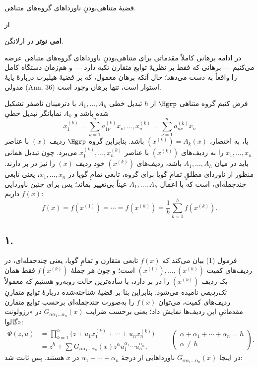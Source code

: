 \documentclass[11pt]{article}
\providecommand{\srcspaced}[1]{{\bfseries #1}}
\begin{document}
\begin{center}
{\Large قضیهٔ متناهی‌بودنِ ناورداهای گروه‌های متناهی.}\par
\vspace{1.2em}
از\par
\vspace{0.8em}
\srcspaced{امی نوتر} در ارلانگن.
\end{center}

در ادامه برهانی کاملاً مقدماتی برای متناهی‌بودنِ ناورداهای گروه‌های متناهی عرضه می‌کنیم --- برهانی که فقط بر نظریهٔ توابع متقارن تکیه دارد --- و هم‌زمان دستگاه کامل را واقعاً به دست می‌دهد؛ حال آنکه برهان معمول، که بر قضیهٔ هیلبرت دربارهٔ پایهٔ مدولی (Ann. 36) استوار است، تنها برهان وجود است.

فرض کنیم گروه متناهی $\Hgrp$ از $h$ تبدیل خطی $A_1,\ldots,A_h$ با دترمینان ناصفر تشکیل شده باشد و $A_k$ نمایانگر تبدیل خطیِ
\[
  x_1^{(k)}=\sum_{\nu=1}^{n}a_{1\nu}^{(k)}x_\nu,\ldots,
  x_n^{(k)}=\sum_{\nu=1}^{n}a_{n\nu}^{(k)}x_\nu
\]
یا، به اختصار، $(x^{(k)})=A_k(x)$ باشد. بنابراین گروه $\Hgrp$ ردیف $(x)$ با عناصر $x_1,\ldots,x_n$ را به ردیف‌های $(x^{(k)})$ با عناصر $x_1^{(k)},\ldots,x_n^{(k)}$ می‌برد. چون تبدیل همانی باید در میان $A_1,\ldots,A_h$ باشد، ردیف‌های $(x^{(k)})$ خود ردیف $(x)$ را نیز در بر دارند. منظور از ناوردای مطلقِ تمامِ گویا برای گروه، تابعی تمامِ گویا در $x_1,\ldots,x_n$، یعنی تابعی چندجمله‌ای، است که با اعمال $A_1,\ldots,A_h$ عیناً بی‌تغییر بماند؛ پس برای چنین ناوردایی $f(x)$ داریم:
\begin{equation}
  f(x)=f(x^{(1)})=\cdots=f(x^{(h)})=
  \frac1h\sum_{k=1}^{h}f(x^{(k)}).
\tag{1}
\end{equation}

\subsection*{۱.}
فرمول (1) بیان می‌کند که $f(x)$ تابعی متقارن و تمامِ گویا، یعنی چندجمله‌ای، در ردیف‌های کمیت $(x^{(1)}),\ldots,(x^{(h)})$ است؛ و چون هر جملهٔ $f(x^{(k)})$ فقط همان یک ردیف $(x^{(k)})$ را در بر دارد، با ساده‌ترین حالت روبه‌رو هستیم که معمولاً \emph{تک‌ردیفی} نامیده می‌شود. بنابراین بنا بر قضیهٔ شناخته‌شده دربارهٔ توابع متقارنِ ردیف‌های کمیت، می‌توان $f(x)$ را به‌صورت چندجمله‌ای برحسب توابع متقارن مقدماتیِ این ردیف‌ها نمایش داد؛ یعنی برحسب ضرایب $G_{\alpha\alpha_1\ldots\alpha_n}(x)$ در «رزولونت گالوا»:
\[
\begin{aligned}
  \Phi(z,u)
  &=\prod_{k=1}^{h}\bigl(z+u_1x_1^{(k)}+\cdots+u_nx_n^{(k)}\bigr) \\
  &=z^h+
    \sum G_{\alpha\alpha_1\ldots\alpha_n}(x)
    z^{\alpha}u_1^{\alpha_1}\cdots u_n^{\alpha_n},
\end{aligned}
\qquad
\left(\begin{array}{c}
\alpha+\alpha_1+\cdots+\alpha_n=h\\
\alpha\ne h
\end{array}\right).
\]
در اینجا $G_{\alpha\alpha_1\ldots\alpha_n}(x)$ ناورداهایی از درجهٔ $\alpha_1+\cdots+\alpha_n$ در $x$ هستند. پس ثابت شد:
\end{document}
